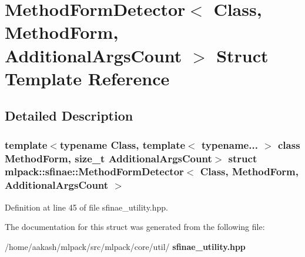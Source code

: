 \section{Method\+Form\+Detector$<$ Class, Method\+Form, Additional\+Args\+Count $>$ Struct Template Reference}
\label{structmlpack_1_1sfinae_1_1MethodFormDetector}


\subsection{Detailed Description}
\subsubsection*{template$<$typename Class, template$<$ typename... $>$ class Method\+Form, size\+\_\+t Additional\+Args\+Count$>$\newline
struct mlpack\+::sfinae\+::\+Method\+Form\+Detector$<$ Class, Method\+Form, Additional\+Args\+Count $>$}



Definition at line 45 of file sfinae\+\_\+utility.\+hpp.



The documentation for this struct was generated from the following file\+:\begin{DoxyCompactItemize}
\item 
/home/aakash/mlpack/src/mlpack/core/util/\textbf{ sfinae\+\_\+utility.\+hpp}\end{DoxyCompactItemize}
